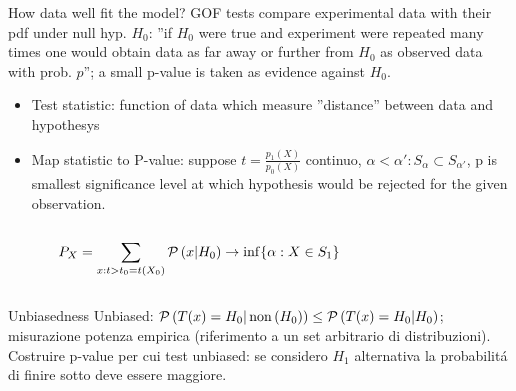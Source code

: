 \begin{frame}{How data well fit the model?}
GOF tests compare experimental data with their pdf under null hyp. $H_0$:  ''if $H_0$ were true and experiment were repeated many times one would obtain data as far away or further from $H_0$ as observed data with prob. $p$''; a small p-value is taken as evidence against $H_0$.
\begin{itemize}
\item Test statistic: function of data which measure ''distance'' between data and hypothesys
\item Map statistic to P-value: suppose $t=\frac{p_1(X)}{p_0(X)}$ continuo, $\alpha<\alpha': S_{\alpha}\subset S_{\alpha'}$,  p is smallest significance level at which hypothesis would be rejected for the given observation.
\end{itemize}
\begin{columns}[T]
\begin{column}{0.5\textwidth}
\[P_X=\sum_{x:t>t_0=t(X_0)}\operatorname{\mathcal{P}}{(x|H_0)}\to\inf\{\alpha: X\in S_1\}\]
\end{column}
\begin{column}{0.5\textwidth}

\end{column}
\end{columns}
\begin{block}{Unbiasedness}
Unbiased: $\operatorname{\mathcal{P}}{(T(x)=H_0|\operatorname{non}{(H_0)})}\leq\operatorname{\mathcal{P}}{(T(x)=H_0|H_0)}$; misurazione potenza empirica (riferimento a un set arbitrario di distribuzioni).
Costruire p-value per cui test unbiased: se considero $H_1$ alternativa la probabilit\'a di finire sotto deve essere maggiore.
\end{block}
\end{frame}

